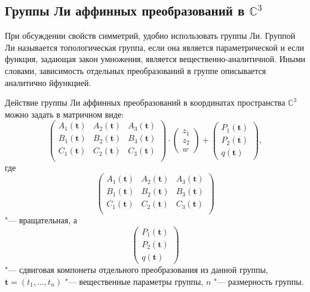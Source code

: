 \documentclass[../main.tex]{subfiles}
\begin{document}
\subsection{Группы Ли аффинных преобразований в $\mathbb{C}^3$}
При обсуждении свойств симметрий, удобно использовать группы Ли. Группой Ли называется топологическая группа, если она является параметрической и если функция, задающая закон умножения, является вещественно-аналитичной. Иными словами, зависимость отдельных преобразований в группе описывается аналитично йфункцией.

Действие группы Ли аффинных преобразований в координатах пространства $\mathbb{C}^3$ можно задать в матричном виде:
\begin{equation}\label{eq:affine_transform}
\begin{pmatrix}
A_1(\mathbf t) & A_2(\mathbf t) & A_3(\mathbf t) \\
B_1(\mathbf t) & B_2(\mathbf t) & B_3(\mathbf t) \\
C_1(\mathbf t) & C_2(\mathbf t) & C_3(\mathbf t) \\
\end{pmatrix}
\cdot
\begin{pmatrix}
z_1 \\
z_2 \\
w
\end{pmatrix}
+
\begin{pmatrix}
P_1(\mathbf t) \\
P_2(\mathbf t) \\
q(\mathbf t)
\end{pmatrix},
\end{equation}
где
\begin{equation*}
\begin{pmatrix}
A_1(\mathbf t) & A_2(\mathbf t) & A_3(\mathbf t) \\
B_1(\mathbf t) & B_2(\mathbf t) & B_3(\mathbf t) \\
C_1(\mathbf t) & C_2(\mathbf t) & C_3(\mathbf t) \\
\end{pmatrix}
\end{equation*}
"--- вращательная, а
\begin{equation*}
\begin{pmatrix}
P_1(\mathbf t) \\
P_2(\mathbf t) \\
q(\mathbf t)
\end{pmatrix}
\end{equation*}
"--- сдвиговая компонеты отдельного преобразования из данной группы, $\mathbf t = (t_1, \hdots, t_n)$ "--- вещественные параметры группы, $n$ "--- размерность группы.
\end{document}
